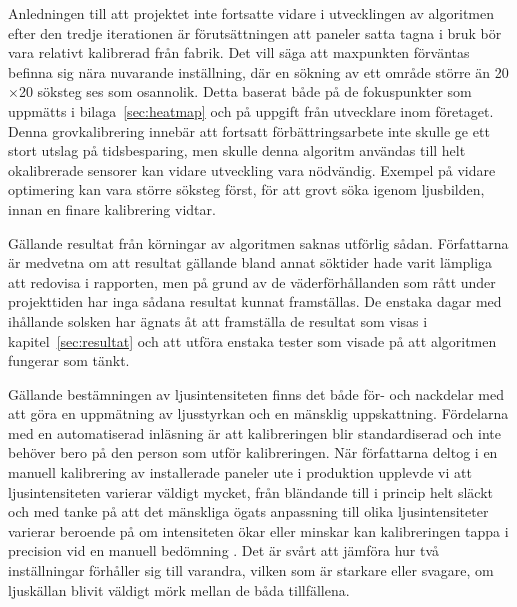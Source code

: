         \newpage
        Anledningen till att projektet inte fortsatte vidare i utvecklingen av algoritmen efter den tredje iterationen är förutsättningen att paneler satta tagna i bruk bör vara relativt kalibrerad från fabrik. Det vill säga att maxpunkten förväntas befinna sig nära nuvarande inställning, där en sökning av ett område större än 20$\times$20 söksteg ses som osannolik. Detta baserat både på de fokuspunkter som uppmätts i bilaga~\ref{sec:heatmap} och på uppgift från utvecklare inom företaget.  Denna grovkalibrering innebär att fortsatt förbättringsarbete inte skulle ge ett stort utslag på tidsbesparing, men skulle denna algoritm användas till helt okalibrerade sensorer kan vidare utveckling vara nödvändig. Exempel på vidare optimering kan vara större söksteg först, för att grovt söka igenom ljusbilden, innan en finare kalibrering vidtar. \bigskip

        Gällande resultat från körningar av algoritmen saknas utförlig sådan. Författarna är medvetna om att resultat gällande bland annat söktider hade varit lämpliga att redovisa i rapporten, men på grund av de väderförhållanden som rått under projekttiden har inga sådana resultat kunnat framställas. De enstaka dagar med ihållande solsken har ägnats åt att framställa de resultat som visas i kapitel~\ref{sec:resultat} och att utföra enstaka tester som visade på att algoritmen fungerar som tänkt.\bigskip

        Gällande bestämningen av ljusintensiteten finns det både för- och nackdelar med att göra en uppmätning av ljusstyrkan och en mänsklig uppskattning. Fördelarna med en automatiserad inläsning är att kalibreringen blir standardiserad och inte behöver bero på den person som utför kalibreringen. När författarna deltog i en manuell kalibrering av installerade paneler ute i produktion upplevde vi att ljusintensiteten varierar väldigt mycket, från bländande till i princip helt släckt och med tanke på att det mänskliga ögats anpassning till olika ljusintensiteter varierar beroende på om intensiteten ökar eller minskar kan kalibreringen tappa i precision vid en manuell bedömning \cite[s.~273]{aot}. Det är svårt att jämföra hur två inställningar förhåller sig till varandra, vilken som är starkare eller svagare, om ljuskällan blivit väldigt mörk mellan de båda tillfällena.\bigskip 

